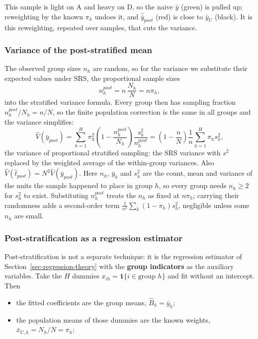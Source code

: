 \documentclass[
  letterpaper,
  DIV=11,
  numbers=noendperiod]{scrreprt}
\providecommand{\tightlist}{%
  \setlength{\itemsep}{0pt}\setlength{\parskip}{0pt}}
\renewcommand{\[}{\begin{equation}}
\renewcommand{\]}{\end{equation}}
\begin{document}
This sample is light on A and heavy on D, so the naive \(\bar y\)
(green) is pulled up; reweighting by the known \(\pi_h\) undoes it, and
\(\hat{\bar y}_{post}\) (red) is close to \(\bar y_U\) (black). It is
this reweighting, repeated over samples, that cuts the variance.

\subsubsection{Variance of the post-stratified
mean}\label{variance-of-the-post-stratified-mean}

The observed group sizes \(n_h\) are random, so for the variance we
substitute their expected values under SRS, the proportional sample
sizes \[
n_h^{post} = n\,\frac{N_h}{N} = n\pi_h ,
\] into the stratified variance formula. Every group then has sampling
fraction \(n_h^{post}/N_h = n/N\), so the finite population correction
is the same in all groups and the variance simplifies: \[
\boxed{\hat V(\bar y_{post}) = \sum_{h=1}^H \pi_h^2\left(1 - \frac{n_h^{post}}{N_h}\right)\frac{s_h^2}{n_h^{post}}
= \left(1 - \frac nN\right)\frac1n\sum_{h=1}^H \pi_h s_h^2},
\] the variance of proportional stratified sampling: the SRS variance
with \(s^2\) replaced by the weighted average of the within-group
variances. Also \(\hat V(\hat t_{post}) = N^2\hat V(\bar y_{post})\).
Here \(n_h\), \(\bar y_h\) and \(s_h^2\) are the count, mean and
variance of the units the sample happened to place in group \(h\), so
every group needs \(n_h \geq 2\) for \(s_h^2\) to exist. Substituting
\(n_h^{post}\) treats the \(n_h\) as fixed at \(n\pi_h\); carrying their
randomness adds a second-order term
\(\frac{1}{n^2}\sum_h(1 - \pi_h)s_h^2\), negligible unless some \(n_h\)
are small.

\subsubsection{Post-stratification as a regression
estimator}\label{sec-poststrat-regression}

Post-stratification is not a separate technique: it is the regression
estimator of Section~\ref{sec-regression-theory} with the \textbf{group
indicators} as the auxiliary variables. Take the \(H\) dummies
\(x_{ih} = \mathbf 1\{i \in \text{group } h\}\) and fit without an
intercept. Then

\begin{itemize}
\tightlist
\item
  the fitted coefficients are the group means, \(\hat B_h = \bar y_h\);
\item
  the population means of those dummies are the known weights,
  \(\bar x_{U,h} = N_h/N = \pi_h\);
\end{itemize}
\end{document}

